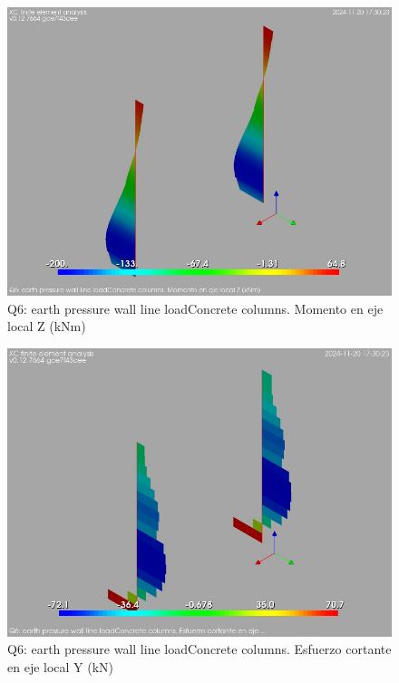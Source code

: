 \begin{figure}[ht]
\begin{center}
\includegraphics[width=\linewidth]{results/graphics/resSimplLC/QearthPWallHrzLcolumnZconcrMz.png}
\caption{Q6: earth pressure wall line loadConcrete columns. Momento en eje local Z (kNm)}
\label{QearthPWallHrzLcolumnZconcrMz}
\end{center}
\end{figure}
\begin{figure}[ht]
\begin{center}
\includegraphics[width=\linewidth]{results/graphics/resSimplLC/QearthPWallHrzLcolumnZconcrVy.png}
\caption{Q6: earth pressure wall line loadConcrete columns. Esfuerzo cortante en eje local Y (kN)}
\label{QearthPWallHrzLcolumnZconcrVy}
\end{center}
\end{figure}
